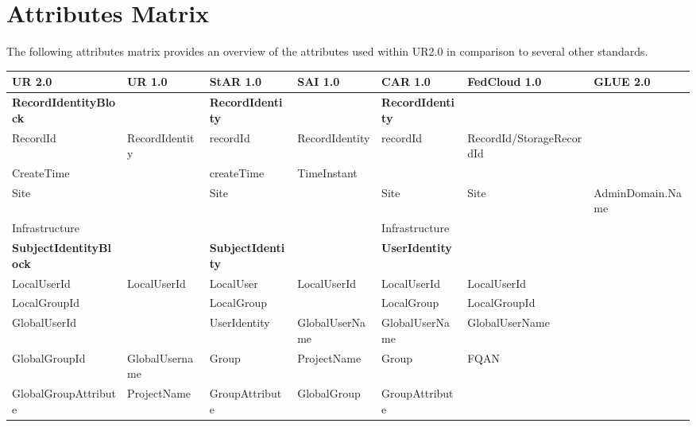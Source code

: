 
\section{Attributes Matrix}

The following attributes matrix provides an overview of the attributes used within UR2.0 in comparison to several other standards.


\footnotesize
\begin{longtable}{ | p{} | p{} | p{} | p{} | p{} | p{} | p{} | }
\hline 
\textbf{UR 2.0} 	& \textbf{UR 1.0} 	& \textbf{StAR 1.0} 	& \textbf{SAI 1.0}	& \textbf{CAR 1.0} 	& \textbf{FedCloud 1.0}			&	\textbf{GLUE 2.0}\\ \hline\hline






\textbf{Record\-Identity\-Block}&  		& \textbf{Record\-Identity}&			& \textbf{Record\-Identity}& 					& \\ \hline
RecordId 		& Record\-Identity 	& record\-Id 		& Record\-Identity	& recor\-dId 		& Record\-Id/Storage\-Record\-Id		& \\ \hline
CreateTime		& 			& create\-Time		& Time\-Instant		&			& 						& \\ \hline
Site			& 			& Site			&			& Site			& Site						& Admin\-Domain.\-Name\\ \hline
Infrastructure		& 			&			&			& Infrastructure	& 						& \\ \hline\hline






\textbf{Subject\-Identity\-Block}& 		& \textbf{Subject\-Identity}&			& \textbf{User\-Identity}&	 					& \\ \hline
Local\-User\-Id		& Local\-User\-Id	& Local\-User		& Local\-User\-Id	& Local\-User\-Id	& Local\-User\-Id				& \\ \hline
LocalGroupId		& 			& Local\-Group		&			& Local\-Group		& Local\-Group\-Id				& \\ \hline
GlobalUserId		& 			& User\-Identity	& Global\-User\-Name	& Global\-User\-Name	& Global\-User\-Name				& \\ \hline
Global\-Group\-Id	& Global\-Username	& Group			& Project\-Name		& Group			& FQAN						& \\ \hline
Global\-Group\-Attribute& Project\-Name		& Group\-Attribute	& Global\-Group		& Group\-Attribute	&						& \\ \hline\hline




\end{longtable}
